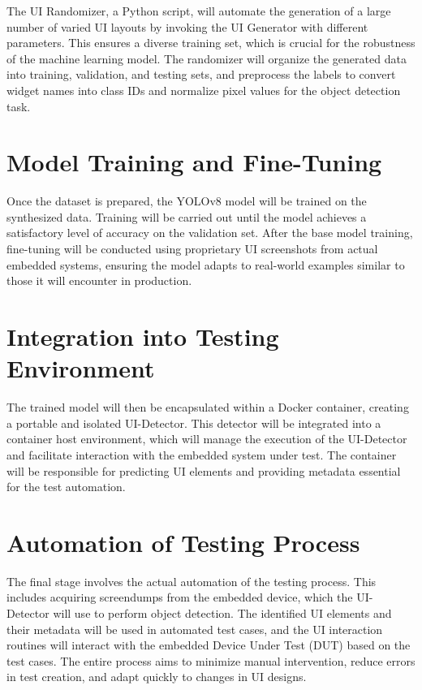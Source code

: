 \documentclass[Proposal,BIC,english,fhCitStyle,IEEE]{BASE/twbook} %
\begin{document}
The UI Randomizer, a Python script, will automate the generation of a large number of varied UI layouts by invoking the UI Generator with different parameters. This ensures a diverse training set, which is crucial for the robustness of the machine learning model. The randomizer will organize the generated data into training, validation, and testing sets, and preprocess the labels to convert widget names into class IDs and normalize pixel values for the object detection task.

\chapter{Model Training and Fine-Tuning}
Once the dataset is prepared, the YOLOv8 model will be trained on the synthesized data. Training will be carried out until the model achieves a satisfactory level of accuracy on the validation set. After the base model training, fine-tuning will be conducted using proprietary UI screenshots from actual embedded systems, ensuring the model adapts to real-world examples similar to those it will encounter in production.

\chapter{Integration into Testing Environment}
The trained model will then be encapsulated within a Docker container, creating a portable and isolated UI-Detector. This detector will be integrated into a container host environment, which will manage the execution of the UI-Detector and facilitate interaction with the embedded system under test. The container will be responsible for predicting UI elements and providing metadata essential for the test automation.

\chapter{Automation of Testing Process}
The final stage involves the actual automation of the testing process. This includes acquiring screendumps from the embedded device, which the UI-Detector will use to perform object detection. The identified UI elements and their metadata will be used in automated test cases, and the UI interaction routines will interact with the embedded Device Under Test (DUT) based on the test cases. The entire process aims to minimize manual intervention, reduce errors in test creation, and adapt quickly to changes in UI designs.
\end{document}
